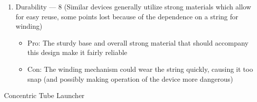 \begin{enumerate}
  \item Durability — 8 (Similar devices generally utilize strong materials which allow for easy reuse, some points lost because of the dependence on a string for winding)

    \begin{itemize}

      \item Pro: The sturdy base and overall strong material that should accompany this design make it fairly reliable

      \item Con: The winding mechanism could wear the string quickly, causing it too snap (and possibly making operation of the device more dangerous)

    \end{itemize}

\end{enumerate}

\begin{center}
  Concentric Tube Launcher
\end{center}

